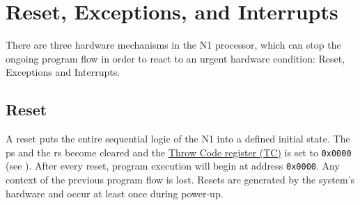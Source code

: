 
\section{Reset, Exceptions, and Interrupts}
\label{reset}

There are three hardware mechanisms in the N1 processor, which can stop the ongoing
program flow in order to react to an urgent hardware condition:
Reset, Exceptions and Interrupts.

\subsection{Reset}
\label{reset:rst}
A reset puts the entire sequential logic of the N1 into a defined initial state.
The \gls{ps} and the \gls{rs} become cleared and
the \hyperref[opcodes:freg:tc]{Throw Code register (TC)} is set to \texttt{0x0000} (see ).
After every reset, program execution will begin at address \texttt{0x0000}.
Any context of the previous program flow is lost.
Resets are generated by the system's hardware and occur at least once during power-up.


